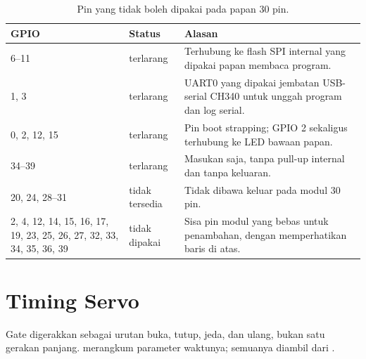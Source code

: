 \begin{table}[H]
\centering
\caption{Pin yang tidak boleh dipakai pada papan 30 pin.}
\label{tab:03-pin-terlarang}
\small
\begin{tabular}{@{}p{1.8cm}p{2.8cm}p{9.9cm}@{}}
\toprule
\textbf{GPIO} & \textbf{Status} & \textbf{Alasan} \\
\midrule
6--11 & terlarang & Terhubung ke flash SPI internal yang dipakai papan membaca
program. \\
1, 3 & terlarang & UART0 yang dipakai jembatan USB-serial CH340 untuk unggah program
dan log serial. \\
0, 2, 12, 15 & terlarang & Pin boot strapping; GPIO 2 sekaligus terhubung ke LED
bawaan papan. \\
34--39 & terlarang & Masukan saja, tanpa pull-up internal dan tanpa keluaran. \\
20, 24, 28--31 & tidak tersedia & Tidak dibawa keluar pada modul 30 pin. \\
2, 4, 12, 14, 15, 16, 17, 19, 23, 25, 26, 27, 32, 33, 34, 35, 36, 39 & tidak
dipakai & Sisa pin modul yang bebas untuk penambahan, dengan memperhatikan baris di
atas. \\
\bottomrule
\end{tabular}
\end{table}

\section{Timing Servo}

Gate digerakkan sebagai urutan buka, tutup, jeda, dan ulang, bukan satu gerakan
panjang.  merangkum parameter waktunya; semuanya diambil dari
.

